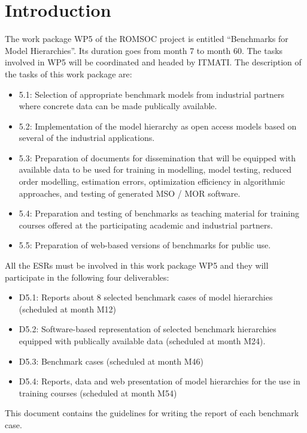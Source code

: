 
\section{Introduction}
The work package WP5 of the \acs{ROMSOC} project is entitled 
``Benchmarks for Model Hierarchies''. 
Its duration goes from month 7 to month 60. 
The tasks involved in WP5 will be coordinated and headed by \ac{ITMATI}. The description of the tasks of this work package are:
\begin{itemize}
\item[] 5.1: Selection of appropriate benchmark models from industrial partners where concrete data can be made publically available. 
\item[] 5.2: Implementation of the model hierarchy as open access models based on several of the industrial applications. 
\item[] 5.3: Preparation of documents for dissemination that will be equipped with available data to be used for training in modelling, model testing, reduced order modelling, estimation errors, optimization efficiency in algorithmic approaches, and testing of generated MSO / MOR software.
\item[] 5.4: Preparation and testing of benchmarks as teaching material for training courses offered at the participating academic and industrial partners.
\item[] 5.5: Preparation of web-based versions of benchmarks for public use. 
\end{itemize}
All the \ac{ESR}s must be involved in this work package WP5 and they will participate in the following four deliverables:
\begin{itemize}
\item[] D5.1: Reports about 8 selected benchmark cases of model hierarchies (scheduled at month M12) 
\item[] D5.2: Software-based representation of selected benchmark hierarchies equipped with publically available data (scheduled at month M24). 
\item[] D5.3: Benchmark cases (scheduled at month M46) 
\item[] D5.4: Reports, data and web presentation of model hierarchies for 
the use in training courses (scheduled at month M54)
\end{itemize}
This document contains the guidelines for writing the report of each benchmark case. 

